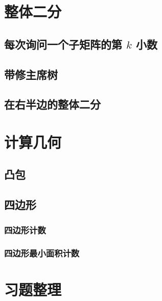 \documentclass[twoside,a4paper]{article}
\begin{document}



\section{整体二分}

\subsection{每次询问一个子矩阵的第 $k$ 小数}


\subsection{带修主席树}


\subsection{在右半边的整体二分}



\section{计算几何}

\subsection{凸包}


\subsection{四边形}
\subsubsection{四边形计数}


\subsubsection{四边形最小面积计数}



\section{习题整理}
\end{document}
